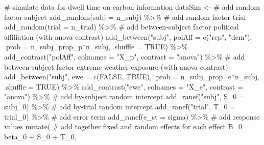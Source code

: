 \documentclass[
  letterpaper,
  DIV=11,
  numbers=noendperiod]{scrartcl}
\newenvironment{Shaded}{\begin{snugshade}}{\end{snugshade}}
\newcommand{\AttributeTok}[1]{\textcolor[rgb]{0.40,0.45,0.13}{#1}}
\newcommand{\CommentTok}[1]{\textcolor[rgb]{0.37,0.37,0.37}{#1}}
\newcommand{\ConstantTok}[1]{\textcolor[rgb]{0.56,0.35,0.01}{#1}}
\newcommand{\FunctionTok}[1]{\textcolor[rgb]{0.28,0.35,0.67}{#1}}
\newcommand{\NormalTok}[1]{\textcolor[rgb]{0.00,0.23,0.31}{#1}}
\newcommand{\OtherTok}[1]{\textcolor[rgb]{0.00,0.23,0.31}{#1}}
\newcommand{\SpecialCharTok}[1]{\textcolor[rgb]{0.37,0.37,0.37}{#1}}
\newcommand{\StringTok}[1]{\textcolor[rgb]{0.13,0.47,0.30}{#1}}
\begin{document}
\begin{Shaded}
\begin{Highlighting}[]
  \CommentTok{\# simulate data for dwell time on carbon information}
\NormalTok{  dataSim }\OtherTok{\textless{}{-}} 
    \CommentTok{\# add random factor subject}
    \FunctionTok{add\_random}\NormalTok{(}\AttributeTok{subj =}\NormalTok{ n\_subj) }\SpecialCharTok{\%\textgreater{}\%} 
    \CommentTok{\# add random factor trial}
    \FunctionTok{add\_random}\NormalTok{(}\AttributeTok{trial =}\NormalTok{ n\_trial) }\SpecialCharTok{\%\textgreater{}\%} 
    \CommentTok{\# add between{-}subject factor political affiliation (with anova contrast)}
    \FunctionTok{add\_between}\NormalTok{(}\StringTok{"subj"}\NormalTok{, }\AttributeTok{polAff =} \FunctionTok{c}\NormalTok{(}\StringTok{"rep"}\NormalTok{, }\StringTok{"dem"}\NormalTok{), }\AttributeTok{.prob =}\NormalTok{ n\_subj\_prop\_p}\SpecialCharTok{*}\NormalTok{n\_subj, }\AttributeTok{.shuffle =} \ConstantTok{TRUE}\NormalTok{) }\SpecialCharTok{\%\textgreater{}\%} 
    \FunctionTok{add\_contrast}\NormalTok{(}\StringTok{"polAff"}\NormalTok{, }\AttributeTok{colnames =} \StringTok{"X\_p"}\NormalTok{, }\AttributeTok{contrast =} \StringTok{"anova"}\NormalTok{) }\SpecialCharTok{\%\textgreater{}\%} 
    \CommentTok{\# add between{-}subject factor extreme weather exposure (with anova contrast)}
    \FunctionTok{add\_between}\NormalTok{(}\StringTok{"subj"}\NormalTok{, }\AttributeTok{ewe =} \FunctionTok{c}\NormalTok{(}\ConstantTok{FALSE}\NormalTok{, }\ConstantTok{TRUE}\NormalTok{), }\AttributeTok{.prob =}\NormalTok{ n\_subj\_prop\_e}\SpecialCharTok{*}\NormalTok{n\_subj, }\AttributeTok{.shuffle =} \ConstantTok{TRUE}\NormalTok{) }\SpecialCharTok{\%\textgreater{}\%} 
    \FunctionTok{add\_contrast}\NormalTok{(}\StringTok{"ewe"}\NormalTok{, }\AttributeTok{colnames =} \StringTok{"X\_e"}\NormalTok{, }\AttributeTok{contrast =} \StringTok{"anova"}\NormalTok{) }\SpecialCharTok{\%\textgreater{}\%} 
    \CommentTok{\# add by{-}subject random intercept}
    \FunctionTok{add\_ranef}\NormalTok{(}\StringTok{"subj"}\NormalTok{, }\AttributeTok{S\_0 =}\NormalTok{ subj\_0) }\SpecialCharTok{\%\textgreater{}\%} 
    \CommentTok{\# add by{-}trial random intercept}
    \FunctionTok{add\_ranef}\NormalTok{(}\StringTok{"trial"}\NormalTok{, }\AttributeTok{T\_0 =}\NormalTok{ trial\_0) }\SpecialCharTok{\%\textgreater{}\%} 
    \CommentTok{\# add error term}
    \FunctionTok{add\_ranef}\NormalTok{(}\AttributeTok{e\_st =}\NormalTok{ sigma) }\SpecialCharTok{\%\textgreater{}\%} 
    \CommentTok{\# add response values}
    \FunctionTok{mutate}\NormalTok{(}
      \CommentTok{\# add together fixed and random effects for each effect}
      \AttributeTok{B\_0 =}\NormalTok{ beta\_0 }\SpecialCharTok{+}\NormalTok{ S\_0 }\SpecialCharTok{+}\NormalTok{ T\_0,}

\end{Highlighting}
\end{Shaded}
\end{document}
